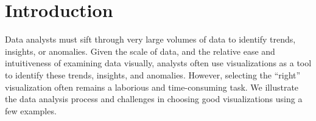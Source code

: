 
\section{Introduction}
\label{sec:introduction}

 
Data analysts must sift through very large volumes of data 
to identify trends, insights, or anomalies. 
Given the scale of data, and the relative ease and 
intuitiveness of examining data visually,
analysts often use visualizations as a tool to identify
these trends, insights, and anomalies.
However, selecting the ``right'' visualization often 
remains a laborious and time-consuming task. 
We illustrate the data analysis
process and challenges in choosing good visualizations using a few examples.




